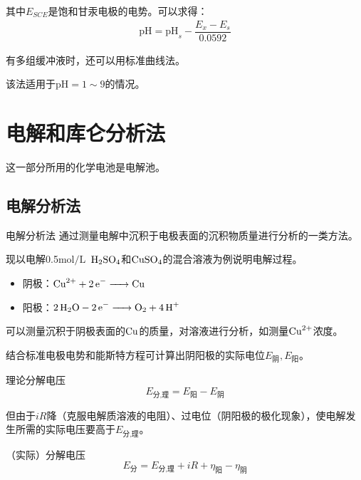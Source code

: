 其中$E_{SCE}$是饱和甘汞电极的电势。可以求得：
\begin{gather*}
	\mathrm{pH}=\mathrm{pH}_s-\dfrac{E_x-E_s}{0.0592}
\end{gather*}

有多组缓冲液时，还可以用标准曲线法。

该法适用于$\mathrm{pH}=1\sim 9$的情况。

\section{电解和库仑分析法}

这一部分所用的化学电池是电解池。

\subsection{电解分析法}
\begin{definition*}{电解分析法}{}
	通过测量电解中沉积于电极表面的沉积物质量进行分析的一类方法。
\end{definition*}

\begin{example}
	现以电解0.5$\mathrm{mol/L}$\ $\ce{H2SO4}$和$\ce{CuSO4}$的混合溶液为例说明电解过程。
	
	\begin{itemize}
		\item 阴极：$\ce{Cu^2+ + 2e- -> Cu}$
		\item 阳极：$\ce{2H2O - 2e- -> O2 + 4H+}$
	\end{itemize}

	可以测量沉积于阴极表面的$\ce{Cu}$的质量，对溶液进行分析，如测量$\ce{Cu^2+}$浓度。
\end{example}

结合标准电极电势和能斯特方程可计算出阴阳极的实际电位$E_{\text{阴}},E_{\text{阳}}$。

\begin{definition*}{理论分解电压}{}
	\begin{equation*}
	E_{\text{分,理}}=E_{\text{阳}}-E_{\text{阴}}
	\end{equation*}
\end{definition*}

但由于$iR$降（克服电解质溶液的电阻）、过电位（阴阳极的极化现象），使电解发生所需的实际电压要高于$E_{\text{分,理}}$。

\begin{definition*}{（实际）分解电压}{}
	\begin{equation*}
	E_{\text{分}}=E_{\text{分,理}}+iR+\eta_{\text{阳}}-\eta_{\text{阴}}
	\end{equation*}
\end{definition*}


